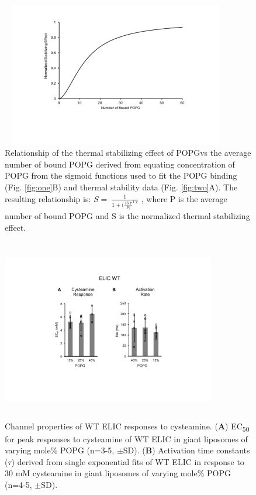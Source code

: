 \documentclass[12pt]{ruthesis_nofloat}
\begin{document}
\renewcommand{\thefigure}{C5}
\begin{figure}
\includegraphics[width=3.93125in,height=2.48554in]{./pandoc_test/media/image15.pdf}

\caption[ Relationship of the thermal stabilizing
effect of POPG] {Relationship of the thermal stabilizing
effect of POPGvs the average number of bound POPG derived from equating
concentration of POPG from the sigmoid functions used to fit the POPG
binding (Fig. \ref{fig:one}B) and thermal stability data (Fig. \ref{fig:two}A). The resulting
relationship is: \(S = \ \frac{1}{1 + {(\frac{13.7}{P)}}^{1.7}}\) ,
where P is the average number of bound POPG and S is the normalized
thermal stabilizing effect.} \label{fig:Supplementary Fig. 5}
\end{figure}


\renewcommand{\thefigure}{C6}
\begin{figure}

\includegraphics[width=3.67880in,height=3.12778in]{./pandoc_test/media/image16.pdf}

 \caption[Channel properties of WT ELIC responses
to cysteamine.] {Channel properties of WT ELIC responses
to cysteamine. (\textbf{A}) EC\textsubscript{50} for peak responses to
cysteamine of WT ELIC in giant liposomes of varying mole\% POPG (n=3-5,
$\pm$SD). (\textbf{B}) Activation time constants ($\tau$) derived from single
exponential fits of WT ELIC in response to 30 mM cysteamine in giant
liposomes of varying mole\% POPG (n=4-5, $\pm$SD). }\label{fig:Supplementary Fig. 6}
\end{figure}
\end{document}
